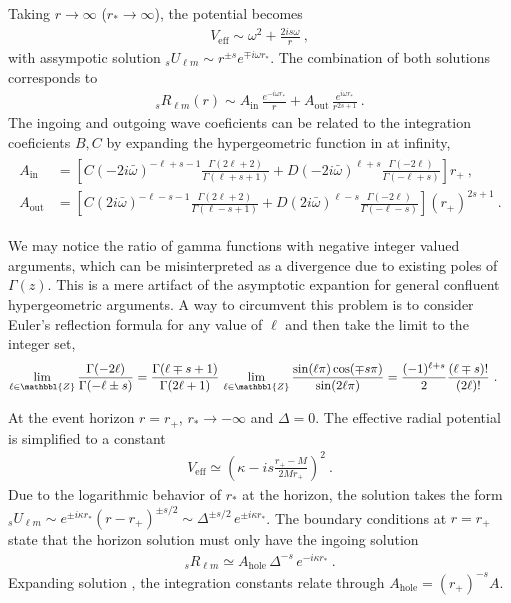 Taking $r\to\infty$ ($r_{*}\to\infty$), the potential becomes
\begin{align}
    \label{eq3:asymptoticVeff}
    V_\mathrm{eff} \sim \omega^2 + \frac{2 i s \omega}{r} ~,
\end{align}
with assympotic solution ${}_{s}U_{\ell m}\sim r^{\pm s} e^{\mp i \omega r_{*}}$.
The combination of both solutions corresponds to
\begin{align}
    {}_{s}R_{\ell m}(r) \sim A_\mathrm{in}\, \frac{e^{-i \omega r_*}}{r} + A_\mathrm{out}\, \frac{e^{i \omega r_*}}{r^{2s+1}} ~.
    \label{eq3:asymptoticR}
\end{align}
The ingoing and outgoing wave coeficients can be related to the integration coeficients $B, C$ by expanding the hypergeometric function in  at infinity,
\begin{align}
    \begin{split}
    A_\mathrm{in} &= \left[ C (-2 i \bar{\omega})^{-\ell+s-1} \frac{\Gamma(2\ell+2)}{\Gamma(\ell+s+1)} + D (-2 i \bar{\omega})^{\ell+s} \frac{\Gamma(-2\ell)}{\Gamma(-\ell+s)} \right] r_{+} ~, \\
    A_\mathrm{out} &= \left[ C (2 i \bar{\omega})^{-\ell-s-1} \frac{\Gamma(2\ell+2)}{\Gamma(\ell-s+1)} + D (2 i \bar{\omega})^{\ell-s} \frac{\Gamma(-2\ell)}{\Gamma(-\ell-s)} \right] (r_{+})^{2s+1}  ~.
    \end{split}
\end{align}

We may notice the ratio of gamma functions with negative integer valued arguments, which can be misinterpreted as a divergence due to existing poles of $\Gamma(z)$.
This is a mere artifact of the asymptotic expantion for general confluent hypergeometric arguments.
A way to circumvent this problem is to consider Euler's reflection formula for any value of $\ell$ and then take the limit to the integer set,
\begin{align}
    \label{eq3:negativeGammaRatio}
    \lim_{\ell\in\mathbbl{Z}} \frac{\Gamma(-2\ell)}{\Gamma(-\ell\pm s)} &= \frac{\Gamma(\ell\mp s+1)}{\Gamma(2\ell+1)} \, \lim_{\ell\in\mathbbl{Z}} \frac{\sin(\ell\pi)\cos(\mp s \pi)}{\sin(2\ell\pi)} = \frac{(-1)^{\ell+s}}{2} \frac{(\ell \mp s)!}{(2\ell)!} ~.
\end{align}
 
At the event horizon $r=r_+$, $r_*\to-\infty$ and $\Delta=0$.
The effective radial potential is simplified to a constant
\begin{align}
    V_\mathrm{eff} \simeq \left( \kappa- i s \frac{r_+ - M}{2 M r_+} \right)^2 ~.
\end{align}
Due to the logarithmic behavior of $r_*$ at the horizon, the solution takes the form ${}_{s}U_{\ell m}\sim e^{\pm i \kappa r_{*} } (r-r_{+})^{\pm s/2} \sim \Delta^{\pm s/2} \,e^{\pm i \kappa r_{*} }$. The boundary conditions at $r=r_{+}$ state that the horizon solution must only have the ingoing solution
\begin{align}
    \label{eq3:boundaryR}
    {}_{s}R_{\ell m} \simeq A_\mathrm{hole} \,\Delta^{-s} \,e^{- i \kappa r_{*} } ~.
\end{align}
Expanding solution , the integration constants relate through $A_\mathrm{hole} = (r_{+})^{-s} A$.

